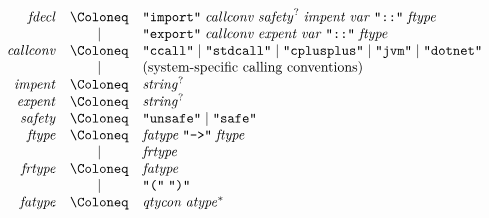 \begin{align*}
  \begin{array}{rcl}
    \mathit{fdecl}
    & \Coloneq & \text{\texttt{\textquotedbl import\textquotedbl}}\; \mathit{callconv}\; \mathit{safety}^?\; \mathit{impent}\; \mathit{var}\; \text{\texttt{\textquotedbl ::\textquotedbl}}\; \mathit{ftype} \\
    & \mid & \text{\texttt{\textquotedbl export\textquotedbl}}\; \mathit{callconv}\; \mathit{expent}\; \mathit{var}\; \text{\texttt{\textquotedbl ::\textquotedbl}}\; \mathit{ftype} \\
    \mathit{callconv}
    & \Coloneq & \text{\texttt{\textquotedbl ccall\textquotedbl}}
    \mid \text{\texttt{\textquotedbl stdcall\textquotedbl}}
    \mid \text{\texttt{\textquotedbl cplusplus\textquotedbl}}
    \mid \text{\texttt{\textquotedbl jvm\textquotedbl}}
    \mid \text{\texttt{\textquotedbl dotnet\textquotedbl}}
    \\
    & \mid & (\text{system-specific calling conventions}) \\
    \mathit{impent}
    & \Coloneq & \mathit{string}^? \\
    \mathit{expent}
    & \Coloneq & \mathit{string}^? \\
    \mathit{safety}
    & \Coloneq & \text{\texttt{\textquotedbl unsafe\textquotedbl}}
    \mid \text{\texttt{\textquotedbl safe\textquotedbl}}
    \\
    \mathit{ftype}
    & \Coloneq & \mathit{fatype}\; \text{\texttt{\textquotedbl ->\textquotedbl}}\; \mathit{ftype} \\
    & \mid & \mathit{frtype} \\
    \mathit{frtype}
    & \Coloneq & \mathit{fatype} \\
    & \mid & \text{\texttt{\textquotedbl(\textquotedbl}}\; \text{\texttt{\textquotedbl)\textquotedbl}} \\
    \mathit{fatype}
    & \Coloneq & \mathit{qtycon}\; \mathit{atype}^*
  \end{array}
\end{align*}

